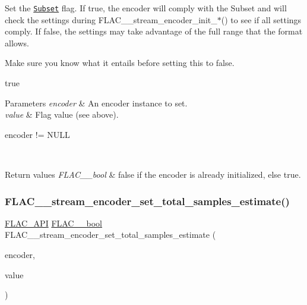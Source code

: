Set the \href{../format.html#subset}{\tt Subset} flag. If {\ttfamily true}, the encoder will comply with the Subset and will check the settings during F\+L\+A\+C\+\_\+\+\_\+stream\+\_\+encoder\+\_\+init\+\_\+$\ast$() to see if all settings comply. If {\ttfamily false}, the settings may take advantage of the full range that the format allows.

Make sure you know what it entails before setting this to {\ttfamily false}.

{\ttfamily true} 
\begin{DoxyParams}{Parameters}
{\em encoder} & An encoder instance to set. \\
\hline
{\em value} & Flag value (see above).  
\begin{DoxyCode}
encoder != NULL 
\end{DoxyCode}
 \\
\hline
\end{DoxyParams}

\begin{DoxyRetVals}{Return values}
{\em F\+L\+A\+C\+\_\+\+\_\+bool} & {\ttfamily false} if the encoder is already initialized, else {\ttfamily true}. \\
\hline
\end{DoxyRetVals}
\mbox{\label{group__flac__stream__encoder_ga0d3f45052f2f7379c73e2b027c7f956c}} 
\subsubsection{\texorpdfstring{F\+L\+A\+C\+\_\+\+\_\+stream\+\_\+encoder\+\_\+set\+\_\+total\+\_\+samples\+\_\+estimate()}{FLAC\_\_stream\_encoder\_set\_total\_samples\_estimate()}}
{\footnotesize\ttfamily \hyperlink{group__flac__export_ga56ca07df8a23310707732b1c0007d6f5}{F\+L\+A\+C\+\_\+\+A\+PI} \hyperlink{ordinals_8h_a95103469f1cbd78b8cf250194985b34e}{F\+L\+A\+C\+\_\+\+\_\+bool} F\+L\+A\+C\+\_\+\+\_\+stream\+\_\+encoder\+\_\+set\+\_\+total\+\_\+samples\+\_\+estimate (\begin{DoxyParamCaption}\item[{\hyperlink{struct_f_l_a_c_____stream_encoder}{F\+L\+A\+C\+\_\+\+\_\+\+Stream\+Encoder} $\ast$}]{encoder,  }\item[{\hyperlink{ordinals_8h_aa78c8c70a3eb8a58af7436f278acde8e}{F\+L\+A\+C\+\_\+\+\_\+uint64}}]{value }\end{DoxyParamCaption})}

